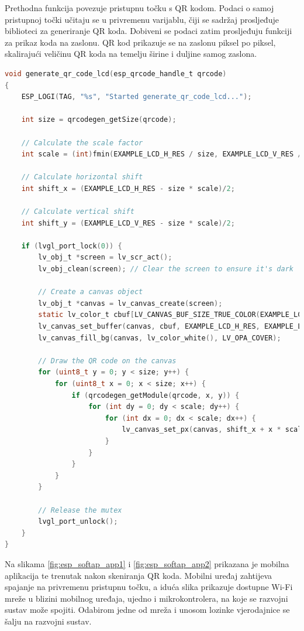 Prethodna funkcija povezuje pristupnu točku s QR kodom. Podaci o samoj pristupnoj točki učitaju se u privremenu varijablu, čiji se sadržaj prosljeđuje biblioteci za generiranje QR koda. Dobiveni se podaci zatim prosljeđuju funkciji za prikaz koda na zaslonu. QR kod prikazuje se na zaslonu piksel po piksel, skalirajući veličinu QR koda na temelju širine i duljine samog zaslona. 

\begin{lstlisting}[caption={Funkcija za prikaz QR koda na zaslonu}, language=c]
void generate_qr_code_lcd(esp_qrcode_handle_t qrcode)
{
	ESP_LOGI(TAG, "%s", "Started generate_qr_code_lcd...");
	
	int size = qrcodegen_getSize(qrcode);
	
	// Calculate the scale factor
	int scale = (int)fmin(EXAMPLE_LCD_H_RES / size, EXAMPLE_LCD_V_RES / size);
	
	// Calculate horizontal shift
	int shift_x = (EXAMPLE_LCD_H_RES - size * scale)/2;
	
	// Calculate vertical shift
	int shift_y = (EXAMPLE_LCD_V_RES - size * scale)/2;
	
	if (lvgl_port_lock(0)) {
		lv_obj_t *screen = lv_scr_act();
		lv_obj_clean(screen); // Clear the screen to ensure it's dark
		
		// Create a canvas object
		lv_obj_t *canvas = lv_canvas_create(screen);
		static lv_color_t cbuf[LV_CANVAS_BUF_SIZE_TRUE_COLOR(EXAMPLE_LCD_H_RES, EXAMPLE_LCD_V_RES)];
		lv_canvas_set_buffer(canvas, cbuf, EXAMPLE_LCD_H_RES, EXAMPLE_LCD_V_RES, LV_IMG_CF_TRUE_COLOR);
		lv_canvas_fill_bg(canvas, lv_color_white(), LV_OPA_COVER);
		
		// Draw the QR code on the canvas
		for (uint8_t y = 0; y < size; y++) {
			for (uint8_t x = 0; x < size; x++) {
				if (qrcodegen_getModule(qrcode, x, y)) {
					for (int dy = 0; dy < scale; dy++) {
						for (int dx = 0; dx < scale; dx++) {
							lv_canvas_set_px(canvas, shift_x + x * scale + dx, shift_y + y * scale + dy, lv_color_black());
						}
					}
				}
			}
		}
		
		// Release the mutex
		lvgl_port_unlock();
	}
}
\end{lstlisting}

Na slikama \ref{fig:esp_softap_app1} i \ref{fig:esp_softap_app2} prikazana je mobilna aplikacija te trenutak nakon skeniranja QR koda. Mobilni uređaj zahtijeva spajanje na privremenu pristupnu točku, a iduća slika prikazuje dostupne Wi-Fi mreže u blizini mobilnog uređaja, ujedno i mikrokontrolera, na koje se razvojni sustav može spojiti. Odabirom jedne od mreža i unosom lozinke vjerodajnice se šalju na razvojni sustav.

